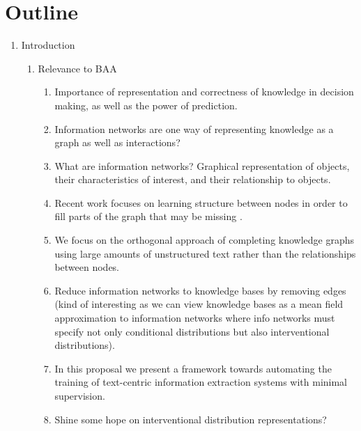 \documentclass[11pt]{article}
\newcommand\set[1]{\left\{#1\right\}}
\newcommand{\bc}{\mathbf{c}}
\newcommand{\be}{\mathbf{e}}
\newcommand{\br}{\mathbf{r}}
\newcommand{\bt}{\mathbf{t}}
\newcommand{\bv}{\mathbf{v}}
\newcommand{\bx}{\mathbf{x}}
\newcommand{\by}{\mathbf{y}}
\newcommand{\bz}{\mathbf{z}}
\begin{document}
\begin{comment}
For task (\textsc{align}), we have the fully observed summary $\by$,
the unobserved content plan $\bz=\bc$, and all records as conditioning $\bx=\br$.
For task (\textsc{values}), we again have the observed summary $\by$,
but we pretend the values are unobserved $\bz=\set{\bc,\bv}$, and
use the rest of the records as conditioning $\bx=\set{\be,\bt}$.
(TODO: functions)
\end{comment}

\newpage

\section*{Outline}
\begin{enumerate}
\item Introduction
    \begin{enumerate}
    \item Relevance to BAA
        \begin{enumerate}
        \item Importance of representation and correctness of knowledge in decision making,
            as well as the power of prediction.
        \item Information networks are one way of representing knowledge as a graph
            as well as interactions?
        \item What are information networks?
            Graphical representation of objects, their characteristics of interest,
            and their relationship to objects.
        \item Recent work focuses on learning structure between nodes
            in order to fill parts of the graph that may be missing \cite{chen2018diva}.
        \item We focus on the orthogonal approach of completing knowledge graphs using
            large amounts of unstructured text rather than the relationships between nodes.
        \item Reduce information networks to knowledge bases by removing edges
            (kind of interesting as we can view knowledge bases as a mean field approximation
            to information networks where info networks must specify not only
            conditional distributions but also interventional distributions).
        \item In this proposal we present a framework towards automating the
            training of text-centric information extraction systems with minimal supervision.
        \item Shine some hope on interventional distribution representations?

\end{enumerate}
\end{enumerate}
\end{enumerate}
\end{document}
